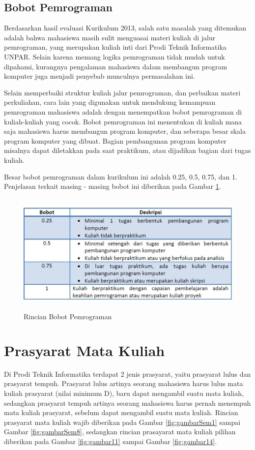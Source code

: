 \subsection{Bobot Pemrograman}
Berdasarkan hasil evaluasi Kurikulum 2013, salah satu masalah yang ditemukan adalah bahwa mahasiswa masih sulit menguasai materi kuliah di jalur pemrograman, yang merupakan kuliah inti dari Prodi Teknik Informatika UNPAR. Selain karena memang logika pemrograman tidak mudah untuk dipahami, kurangnya pengalaman mahasiswa dalam membangun program komputer juga menjadi penyebab munculnya permasalahan ini.

Selain memperbaiki struktur kuliah jalur pemrograman, dan perbaikan materi perkuliahan, cara lain yang digunakan untuk mendukung kemampuan pemrograman mahasiswa adalah dengan menempatkan bobot pemrograman di kuliah-kuliah yang cocok. Bobot pemrograman ini menentukan di kuliah mana saja mahasiswa harus membangun program komputer, dan seberapa besar skala program komputer yang
dibuat. Bagian pembangunan program komputer misalnya dapat diletakkan pada saat praktikum, atau dijadikan bagian dari tugas kuliah.

Besar bobot pemrograman dalam kurikulum ini adalah 0.25, 0.5, 0.75, dan 1. Penjelasan terkait masing - masing
bobot ini diberikan pada Gambar \ref{fig:gambar3}.

\begin{figure}[H]
    \centering
    \includegraphics[width=12cm, height=6cm]{Gambar/Bobot Pemorgraman .jpg}
    \caption{Rincian Bobot Pemrograman}
    \label{fig:gambar3}
\end{figure}

\section{Prasyarat Mata Kuliah}
Di Prodi Teknik Informatika terdapat 2 jenis prasyarat, yaitu prasyarat lulus dan prasyarat tempuh. Prasyarat lulus artinya seorang mahasiswa harus lulus mata kuliah prasyarat (nilai minimum D), baru dapat mengambil suatu mata kuliah, sedangkan prasyarat tempuh artinya seorang mahasiswa harus pernah menempuh mata kuliah prasyarat, sebelum dapat mengambil suatu mata kuliah. Rincian prasyarat mata kuliah wajib diberikan pada Gambar \ref{fig:gambarSem1} sampai Gambar \ref{fig:gambarSem8}, sedangkan rincian prasayarat mata kuliah pilihan diberikan pada Gambar \ref{fig:gambar11} sampai Gambar \ref{fig:gambar14}.


